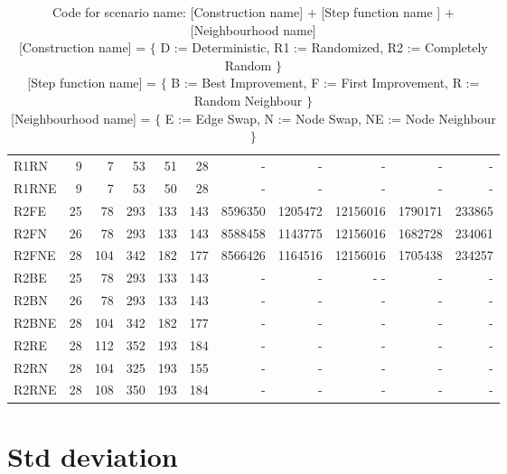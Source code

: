 \documentclass [11pt]{article}
\begin{document}
\begin{sidewaystable}
\begin{tabu} {| l |r | r |r |r |r |r |r |r |r |r |}
  R1RN    & 9  & 7   & 53   & 51 &  28  &  -   &   -    &   -    &    -   &   -    \\ 
  R1RNE    &9   &7    &53    &50  & 28   &  -   &   -    &   -    &    -   &   -    \\ 
  R2FE    & 25  &  78   & 293   & 133  &  143  &  8596350  &  1205472   & 12156016    &  1790171  & 233865   \\ 
  R2FN    & 26  &  78   & 293   & 133  &  143  &  8588458  &  1143775   & 12156016    &  1682728  & 234061   \\ 
  R2FNE    &28   &104    &342    &182   & 177   & 8566426   & 1164516    & 12156016    & 1705438   &234257    \\ 
  R2BE    & 25  &  78   & 293   & 133  &  143  &  -   &   -    &   -  -    &    -   &   -    \\ 
  R2BN    & 26  &  78   & 293   & 133  &  143  &  -   &   -    &   -    &    -   &   -    \\ 
  R2BNE    &28   &104    &342    &182   & 177   &  -   &   -    &   -    &    -   &   -    \\ 
  R2RE    & 28  & 112   & 352   & 193  &  184  &  -   &   -    &   -    &    -   &   -    \\ 
  R2RN    & 28  & 104   & 325   & 193  &  155  &  -   &   -    &   -    &    -   &   -    \\ 
  R2RNE    &28   &108    &350    &193   & 184   &  -   &   -    &   -    &    -   &   -    \\
\end{tabu}
\caption{ Code for scenario name: [Construction name] + [Step function name ]  + [Neighbourhood name] \\ 
          {[Construction name]} = $\{$  D := Deterministic, R1 := Randomized, R2 := Completely Random $\}$  \\
          {[Step function name]} = $\{$  B := Best Improvement, F := First Improvement, R := Random Neighbour $\}$ \\
          {[Neighbourhood name]} = $\{$  E := Edge Swap, N := Node Swap, NE := Node Neighbour $\}$ } 
\end{sidewaystable}

\section{Std deviation}
\end{document}
